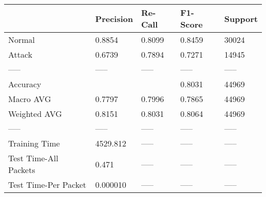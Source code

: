 \begin{tabular}{lllll}
\toprule
{} & Precision & Re-Call & F1-Score & Support \\
\midrule
Normal                &    0.8854 &  0.8099 &   0.8459 &   30024 \\
Attack                &    0.6739 &  0.7894 &   0.7271 &   14945 \\
-----                 &     ----- &   ----- &    ----- &   ----- \\
Accuracy              &           &         &   0.8031 &   44969 \\
Macro AVG             &    0.7797 &  0.7996 &   0.7865 &   44969 \\
Weighted AVG          &    0.8151 &  0.8031 &   0.8064 &   44969 \\
-----                 &     ----- &   ----- &    ----- &   ----- \\
Training Time         &  4529.812 &   ----- &    ----- &   ----- \\
Test Time-All Packets &     0.471 &   ----- &    ----- &   ----- \\
Test Time-Per Packet  &  0.000010 &   ----- &    ----- &   ----- \\
\bottomrule
\end{tabular}
